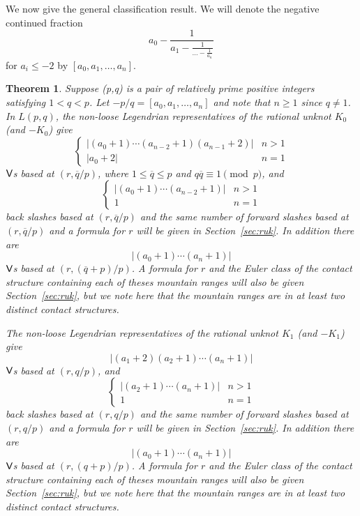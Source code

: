 \documentclass[11pt]{amsart}
\theoremstyle{plain}
\newtheorem{theorem}{Theorem}
\theoremstyle{definition}
\theoremstyle{remark}
\numberwithin{theorem}{section}
\begin{document}
We now give the general classification result. We will denote the negative continued fraction 
\[
a_0-\frac{1}{a_1-\frac{1}{\ldots - \frac{1}{a_n}}}
\]
for $a_i \leq -2$ by $[a_0, a_1, \ldots, a_n]$. 
\begin{theorem}\label{lensgeneral}
Suppose (p,q) is a pair of relatively prime positive integers satisfying $1 < q < p$. Let $-p/q=[a_0,a_1, \ldots, a_n]$ and note that $n\geq 1$ since $q\not= 1$. In $L(p,q)$, the non-loose Legendrian representatives of the rational unknot $K_0$ (and $-K_0$) give 
\[
\begin{cases}
  \left|(a_0+1)\cdots (a_{n-2}+1)(a_{n-1}+2)\right| & n > 1\\
  |a_0 + 2| & n =1
\end{cases}
\]
$\normalfont\textsf{V}$s based at $(r,\overline{q}/p)$, where $1 \leq \overline{q} \leq p$ and $q\overline{q} \equiv 1 \pmod p$, and 
\[
  \begin{cases}
  |(a_0+1)\cdots (a_{n-2}+1)| & n > 1\\
  1 & n = 1
  \end{cases}
\]
 back slashes based at $(r,\overline{q}/p)$ and the same number of forward slashes based at $(r, \overline{q}/p)$ and a formula for $r$ will be given in Section~\ref{sec:ruk}. In addition there are 
 \[
  |(a_0+1)\cdots (a_{n}+1)|
 \] 
 $\normalfont\textsf{V}$s based at $(r,(\overline{q}+p)/p)$. A formula for $r$ and the Euler class of the contact structure containing each of theses mountain ranges will also be given Section~\ref{sec:ruk}, but we note here that the mountain ranges are in at least two distinct contact structures. 
 


  The non-loose Legendrian representatives of the rational unknot $K_1$ (and $-K_1$) give 
  \[
  \left|(a_{1}+2)(a_{2}+1)\cdots (a_n+1)\right| 
\]
$\normalfont\textsf{V}$s based at $(r,q/p)$, and 
\[
  \begin{cases}
  |(a_2+1)\cdots (a_n+1)| & n > 1\\
  1 & n = 1
  \end{cases}
\]
 back slashes based at $(r,q/p)$ and the same number of forward slashes based at $(r, q/p)$ and a formula for $r$ will be given in Section~\ref{sec:ruk}. In addition there are 
 \[
  |(a_0+1)\cdots (a_{n}+1)|
 \] 
 $\normalfont\textsf{V}$s based at $(r,(q+p)/p)$. A formula for $r$ and the Euler class of the contact structure containing each of theses mountain ranges will also be given Section~\ref{sec:ruk}, but we note here that the mountain ranges are in at least two distinct contact structures. 
\end{theorem}
\end{document}
